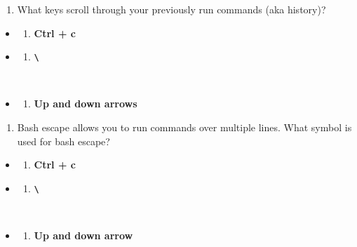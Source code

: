 \documentclass[
  letterpaper,
  DIV=11,
  numbers=noendperiod]{scrreprt}
\providecommand{\tightlist}{%
  \setlength{\itemsep}{0pt}\setlength{\parskip}{0pt}}
\begin{document}
\begin{enumerate}
\def\labelenumi{\arabic{enumi}.}
\setcounter{enumi}{4}
\tightlist
\item
  What keys scroll through your previously run commands (aka history)?
\end{enumerate}

\begin{itemize}
\tightlist
\item
  \begin{enumerate}
  \def\labelenumi{(\Alph{enumi})}
  \tightlist
  \item
    \textbf{Ctrl + c}\\
  \end{enumerate}
\item
  \begin{enumerate}
  \def\labelenumi{(\Alph{enumi})}
  \setcounter{enumi}{1}
  \tightlist
  \item
    \textbf{\texttt{\textbackslash{}}}\strut \\
  \end{enumerate}
\item
  \begin{enumerate}
  \def\labelenumi{(\Alph{enumi})}
  \setcounter{enumi}{2}
  \tightlist
  \item
    \textbf{Up and down arrows}
  \end{enumerate}
\end{itemize}

\begin{enumerate}
\def\labelenumi{\arabic{enumi}.}
\setcounter{enumi}{5}
\tightlist
\item
  Bash escape allows you to run commands over multiple lines. What
  symbol is used for bash escape?
\end{enumerate}

\begin{itemize}
\tightlist
\item
  \begin{enumerate}
  \def\labelenumi{(\Alph{enumi})}
  \tightlist
  \item
    \textbf{Ctrl + c}\\
  \end{enumerate}
\item
  \begin{enumerate}
  \def\labelenumi{(\Alph{enumi})}
  \setcounter{enumi}{1}
  \tightlist
  \item
    \textbf{\texttt{\textbackslash{}}}\strut \\
  \end{enumerate}
\item
  \begin{enumerate}
  \def\labelenumi{(\Alph{enumi})}
  \setcounter{enumi}{2}
  \tightlist
  \item
    \textbf{Up and down arrow}
  \end{enumerate}
\end{itemize}
\end{document}
